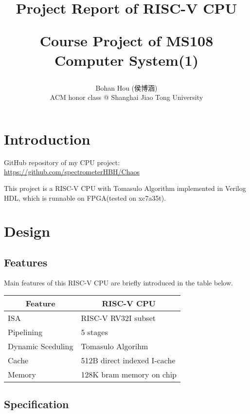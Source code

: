 \documentclass[12pt, a4paper]{article}
\title{Project Report of RISC-V CPU\\\begin{large}Course Project of MS108 Computer System(1)\end{large}}
\author{Bohan Hou (侯博涵)\\ACM honor class @ Shanghai Jiao Tong University}
\date{}
\theoremstyle{margin}
\begin{document}
\maketitle

\section{Introduction}

GitHub repository of my CPU project: \url{https://github.com/spectrometerHBH/Chaos}

This project is a RISC-V CPU with Tomasulo Algorithm implemented in Verilog HDL, which is runnable on FPGA(tested on xc7a35t). 

\section{Design}

\subsection{Features}

Main features of this RISC-V CPU are briefly introduced in the table below.

\begin{table}[H]
\centering
\begin{tabular}{@{}ll@{}}
\toprule
\multicolumn{1}{c}{Feature} & \multicolumn{1}{c}{RISC-V CPU}                                                                        \\ \midrule
ISA                         & RISC-V RV32I subset\\
Pipelining                  & 5 stages \\
Dynamic Sceduling           & Tomasulo Algorihm \\
Cache                       & 512B direct indexed I-cache\\
Memory                      & 128K bram memory on chip \\ 
\bottomrule
\end{tabular}
\end{table}

\subsection{Specification}
\end{document}
